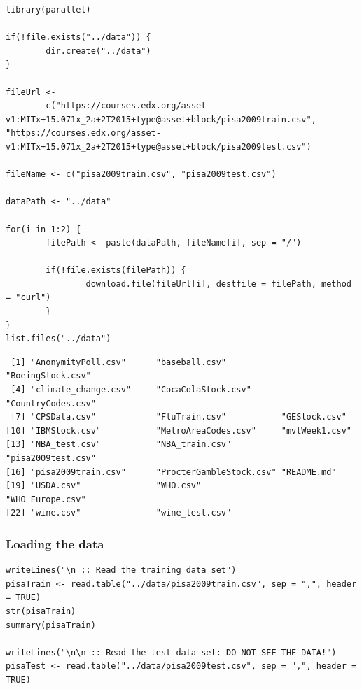 \documentclass[letterpaper, 9pt, onecolumn, twoside, technote, final]{IEEEtran}
\begin{document}
\begin{verbatim}
library(parallel)

if(!file.exists("../data")) {
        dir.create("../data")
}

fileUrl <-
        c("https://courses.edx.org/asset-v1:MITx+15.071x_2a+2T2015+type@asset+block/pisa2009train.csv", "https://courses.edx.org/asset-v1:MITx+15.071x_2a+2T2015+type@asset+block/pisa2009test.csv")

fileName <- c("pisa2009train.csv", "pisa2009test.csv")

dataPath <- "../data"

for(i in 1:2) {
        filePath <- paste(dataPath, fileName[i], sep = "/")

        if(!file.exists(filePath)) {
                download.file(fileUrl[i], destfile = filePath, method = "curl")
        }
}
list.files("../data")
\end{verbatim}

\begin{verbatim}
 [1] "AnonymityPoll.csv"      "baseball.csv"           "BoeingStock.csv"
 [4] "climate_change.csv"     "CocaColaStock.csv"      "CountryCodes.csv"
 [7] "CPSData.csv"            "FluTrain.csv"           "GEStock.csv"
[10] "IBMStock.csv"           "MetroAreaCodes.csv"     "mvtWeek1.csv"
[13] "NBA_test.csv"           "NBA_train.csv"          "pisa2009test.csv"
[16] "pisa2009train.csv"      "ProcterGambleStock.csv" "README.md"
[19] "USDA.csv"               "WHO.csv"                "WHO_Europe.csv"
[22] "wine.csv"               "wine_test.csv"
\end{verbatim}

\subsubsection{Loading the data}
\label{sec-2-1-2}

\begin{verbatim}
writeLines("\n :: Read the training data set")
pisaTrain <- read.table("../data/pisa2009train.csv", sep = ",", header = TRUE)
str(pisaTrain)
summary(pisaTrain)

writeLines("\n\n :: Read the test data set: DO NOT SEE THE DATA!")
pisaTest <- read.table("../data/pisa2009test.csv", sep = ",", header = TRUE)
\end{verbatim}
\end{document}
